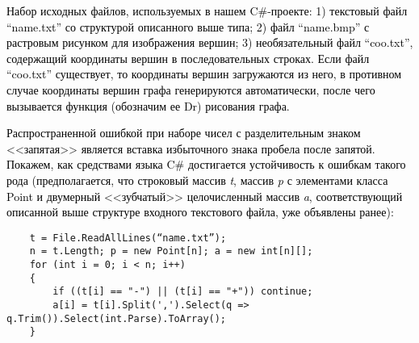 \textcolor{black}{Набор исходных файлов, используемых в нашем
}\foreignlanguage{english}{\textcolor{black}{C}}\textcolor{black}{\#-проекте: 1) текстовый файл \linebreak
	“}\foreignlanguage{english}{\textcolor{black}{name}}\textcolor{black}{.}\foreignlanguage{english}{\textcolor{black}{txt}}\textcolor{black}{”
	со структурой описанного выше типа; 2) файл
	“}\foreignlanguage{english}{\textcolor{black}{name}}\textcolor{black}{.}\foreignlanguage{english}{\textcolor{black}{bmp}}\textcolor{black}{”
	с растровым рисунком для изображения вершин; 3) необязательный файл
	“}\foreignlanguage{english}{\textcolor{black}{coo}}\textcolor{black}{.}\foreignlanguage{english}{\textcolor{black}{txt}}\textcolor{black}{”,
	содержащий координаты вершин в последовательных строках. Если файл
	“}\foreignlanguage{english}{\textcolor{black}{coo}}\textcolor{black}{.}\foreignlanguage{english}{\textcolor{black}{txt}}\textcolor{black}{”
	существует, то координаты вершин загружаются из него, в противном случае координаты вершин графа генерируются
	автоматически, после чего вызывается функция (обозначим ее
}\foreignlanguage{english}{\textcolor{black}{Dr}}\textcolor{black}{) рисования графа.}

\textcolor{black}{Распространенной ошибкой при наборе чисел с разделительным знаком <<запятая>> является вставка
	избыточного знака пробела после запятой. Покажем, как средствами языка
}\foreignlanguage{english}{\textcolor{black}{C}}\textcolor{black}{\# достигается устойчивость к ошибкам такого рода
	(предполагается, что строковый массив }\foreignlanguage{english}{\textit{\textcolor{black}{t}}}\textcolor{black}{,
	массив }\foreignlanguage{english}{\textit{\textcolor{black}{p}}}\textcolor{black}{ с элементами класса Point и двумерный <<зубчатый>> целочисленный
	массив }\foreignlanguage{english}{\textit{\textcolor{black}{a}}}\textcolor{black}{, соответствующий описанной выше
	структуре входного текстового файла, уже объявлены ранее):}

\begin{verbatim}
	t = File.ReadAllLines(“name.txt”);
	n = t.Length; p = new Point[n]; a = new	int[n][];
	for (int i = 0; i < n; i++)
	{
		if ((t[i] == "-") || (t[i] == "+")) continue;
		a[i] = t[i].Split(',').Select(q => q.Trim()).Select(int.Parse).ToArray();
	}
\end{verbatim}
%
%
%
%
%
%

